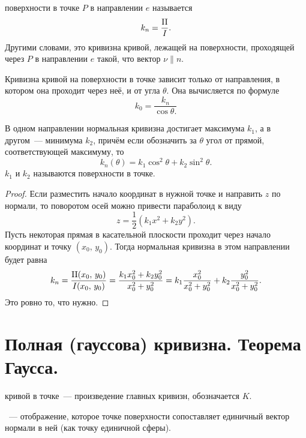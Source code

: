 \documentclass{notes}
\newcommand{\II}{\mr{II}}
\begin{document}
	\begin{de}
		 поверхности в точке $P$ в направлении $e$ называется 
		\[
			k_n = \dfrac{\II}{I}.
		\]
		Другими словами, это кривизна кривой, лежащей на поверхности, проходящей через $P$ в направлении $e$ такой, что вектор $\nu \parallel n$.
	\end{de}

	\begin{thm}[Мёнье]
		Кривизна кривой на поверхности в точке зависит только от направления, в котором она проходит через неё, и от угла $\theta$. Она вычисляется по формуле
		\[
			k_0 = \dfrac{k_n}{\cos \theta.}
		\]
	\end{thm}

	\begin{thm}
		В одном направлении нормальная кривизна достигает максимума $k_1$, а в другом~--- минимума $k_2$, причём если обозначить за $\theta$ угол от прямой, соответствующей максимуму, то
		\[
			k_n(\theta) = k_1 \cos^2 \theta + k_2 \sin^2 \theta.
		\]
		$k_1$ и $k_2$ называются  поверхности в точке.
		\begin{proof}
			Если разместить начало координат в нужной точке и направить $z$ по нормали, то поворотом осей можно привести параболоид к виду
			\[
				z = \dfrac{1}{2}(k_1 x^2 + k_2 y^2).
			\]
			Пусть некоторая прямая в касательной плоскости проходит через начало координат и точку $(x_0, \, y_0)$. Тогда нормальная кривизна в этом направлении будет равна
			\[
				k_n = \dfrac{\II(x_0, \, y_0)}{I(x_0, \, y_0)} = \dfrac{k_1 x_0^2 + k_2 y_0^2}{x_0^2 + y_0^2} = k_1 \dfrac{x_0^2}{x_0^2 + y_0^2} + k_2 \dfrac{y_0^2}{x_0^2 + y_0^2}.
			\]
			Это ровно то, что нужно.
		\end{proof}
	\end{thm}

\section{Полная (гауссова) кривизна. Теорема Гаусса.}

	\begin{de}
		 кривой в точке~--- произведение главных кривизн, обозначается $K$.
	\end{de}

	\begin{de}
		~--- отображение, которое точке поверхности сопоставляет единичный вектор нормали в ней (как точку единичной сферы).
	\end{de}
\end{document}
